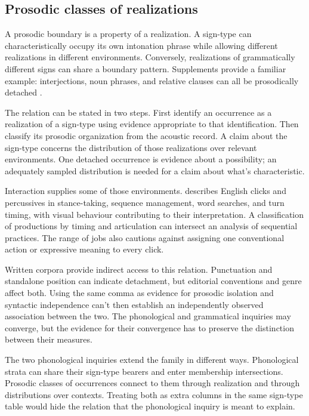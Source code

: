 \documentclass[12pt]{article}
\begin{document}
\subsection{Prosodic classes of realizations}

A prosodic boundary is a property of a realization. A sign-type can
characteristically occupy its own intonation phrase while allowing different
realizations in different environments. Conversely, realizations of
grammatically different signs can share a boundary pattern. Supplements
provide a familiar example: interjections, noun phrases, and relative
clauses can all be prosodically detached
\citep[66, 1350]{HuddlestonPullum2002}.

The relation can be stated in two steps. First identify an occurrence
as a realization of a sign-type using evidence appropriate to that
identification. Then classify its prosodic organization from the acoustic
record. A claim about the sign-type concerns the distribution of those
realizations over relevant environments. One detached occurrence is
evidence about a possibility; an adequately sampled distribution is needed
for a claim about what's characteristic.

Interaction supplies some of those environments. \textcite{ogden2013clicks} describes English
clicks and percussives in stance-taking, sequence management, word searches,
and turn timing, with visual behaviour contributing to their interpretation. A classification of productions by timing and
articulation can intersect an analysis of sequential practices.
The range of jobs also cautions against assigning one conventional action
or expressive meaning to every click.

Written corpora provide indirect access to this relation. Punctuation
and standalone position can indicate detachment, but editorial conventions
and genre affect both. Using the same comma as evidence for prosodic
isolation and syntactic independence can't then establish an independently
observed association between the two. The phonological and grammatical
inquiries may converge, but the evidence for their convergence has to
preserve the distinction between their measures.

The two phonological inquiries extend the family in different ways. Phonological strata can share their sign-type bearers and
enter membership intersections. Prosodic classes of occurrences connect
to them through realization and through distributions over contexts.
Treating both as extra columns in the same sign-type table would hide
the relation that the phonological inquiry is meant to explain.
\end{document}
